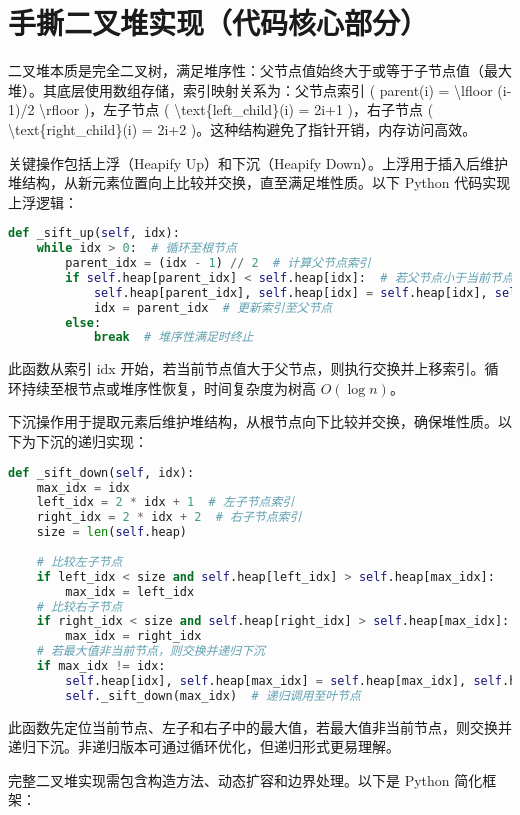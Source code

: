 \chapter{手撕二叉堆实现（代码核心部分）}
二叉堆本质是完全二叉树，满足堆序性：父节点值始终大于或等于子节点值（最大堆）。其底层使用数组存储，索引映射关系为：父节点索引 ( parent(i) = \textbackslash{}lfloor (i-1)/2 \textbackslash{}rfloor )，左子节点 ( \textbackslash{}text\{{}left\_{}child\}{}(i) = 2i+1 )，右子节点 ( \textbackslash{}text\{{}right\_{}child\}{}(i) = 2i+2 )。这种结构避免了指针开销，内存访问高效。\par
关键操作包括上浮（Heapify Up）和下沉（Heapify Down）。上浮用于插入后维护堆结构，从新元素位置向上比较并交换，直至满足堆性质。以下 Python 代码实现上浮逻辑：\par
\begin{lstlisting}[language=python]
def _sift_up(self, idx):
    while idx > 0:  # 循环至根节点
        parent_idx = (idx - 1) // 2  # 计算父节点索引
        if self.heap[parent_idx] < self.heap[idx]:  # 若父节点小于当前节点
            self.heap[parent_idx], self.heap[idx] = self.heap[idx], self.heap[parent_idx]  # 交换位置
            idx = parent_idx  # 更新索引至父节点
        else:
            break  # 堆序性满足时终止
\end{lstlisting}
此函数从索引 idx 开始，若当前节点值大于父节点，则执行交换并上移索引。循环持续至根节点或堆序性恢复，时间复杂度为树高 $O(\log n)$。\par
下沉操作用于提取元素后维护堆结构，从根节点向下比较并交换，确保堆性质。以下为下沉的递归实现：\par
\begin{lstlisting}[language=python]
def _sift_down(self, idx):
    max_idx = idx
    left_idx = 2 * idx + 1  # 左子节点索引
    right_idx = 2 * idx + 2  # 右子节点索引
    size = len(self.heap)
    
    # 比较左子节点
    if left_idx < size and self.heap[left_idx] > self.heap[max_idx]:
        max_idx = left_idx
    # 比较右子节点
    if right_idx < size and self.heap[right_idx] > self.heap[max_idx]:
        max_idx = right_idx
    # 若最大值非当前节点，则交换并递归下沉
    if max_idx != idx:
        self.heap[idx], self.heap[max_idx] = self.heap[max_idx], self.heap[idx]
        self._sift_down(max_idx)  # 递归调用至叶节点
\end{lstlisting}
此函数先定位当前节点、左子和右子中的最大值，若最大值非当前节点，则交换并递归下沉。非递归版本可通过循环优化，但递归形式更易理解。\par
完整二叉堆实现需包含构造方法、动态扩容和边界处理。以下是 Python 简化框架：\par
